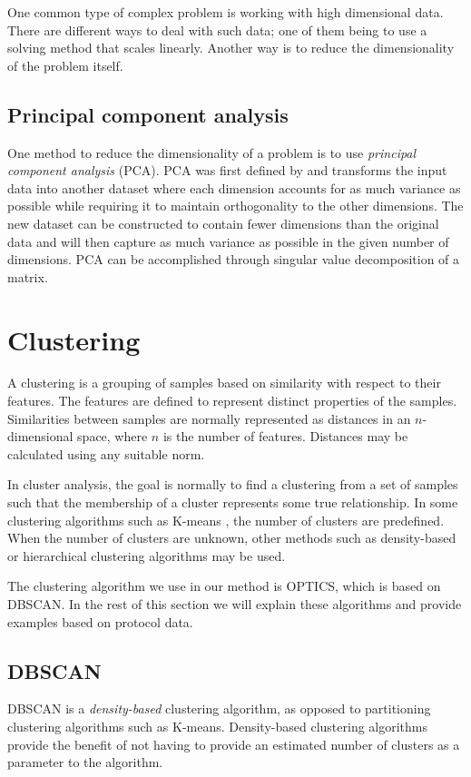 \documentclass[a4paper]{report}
\begin{document}
One common type of complex problem is working with high dimensional data. There
are different ways to deal with such data; one of them being to use a solving
method that scales linearly. Another way is to reduce the dimensionality of the
problem itself.

\subsection{Principal component analysis}
\label{sec:pca}
One method to reduce the dimensionality of a problem is to use \emph{principal
component analysis} (PCA). PCA was first defined by \citet{pearson01} and
transforms the input data into another dataset where each dimension accounts
for as much variance as possible while requiring it to maintain orthogonality
to the other dimensions. The new dataset can be constructed to contain fewer
dimensions than the original data and will then capture as much variance as
possible in the given number of dimensions. PCA can be accomplished through
singular value decomposition of a matrix.

\section{Clustering}
A clustering is a grouping of samples based on similarity with respect to their
features. The features are defined to represent distinct properties of the
samples. Similarities between samples are normally represented as distances in
an $n$-dimensional space, where $n$ is the number of features. Distances may be
calculated using any suitable norm.

In cluster analysis, the goal is normally to find a clustering from a
set of samples such that the membership of a cluster represents some true
relationship. In some clustering algorithms such as K-means \citep{macqueen67},
the number of clusters are predefined. When the number of clusters are unknown,
other methods such as density-based or hierarchical clustering algorithms may
be used.

The clustering algorithm we use in our method is OPTICS, which is based on
DBSCAN. In the rest of this section we will explain these algorithms and
provide examples based on protocol data.

\subsection{DBSCAN}
DBSCAN is a \emph{density-based} clustering algorithm, as opposed to
partitioning clustering algorithms such as K-means. Density-based clustering
algorithms provide the benefit of not having to provide an estimated number
of clusters as a parameter to the algorithm.
\end{document}
